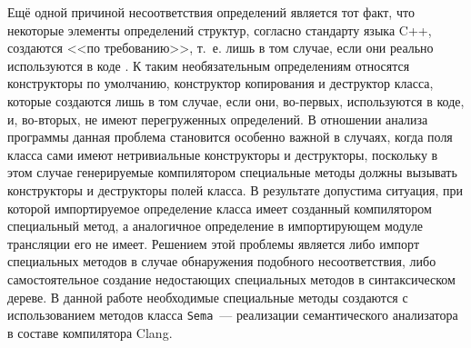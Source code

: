 Ещё одной причиной несоответствия определений является тот факт, что некоторые элементы определений структур, согласно стандарту языка C++, создаются <<по требованию>>, т.~е. лишь в том случае, если они реально используются в коде \cite{cpp-std}. К таким необязательным определениям относятся конструкторы по умолчанию, конструктор копирования и деструктор класса, которые создаются лишь в том случае, если они, во-первых, используются в коде, и, во-вторых, не имеют перегруженных определений. В отношении анализа программы данная проблема становится особенно важной в случаях, когда поля класса сами имеют нетривиальные конструкторы и деструкторы, поскольку в этом случае генерируемые компилятором специальные методы должны вызывать конструкторы и деструкторы полей класса. В результате допустима ситуация, при которой импортируемое определение класса имеет созданный компилятором специальный метод, а аналогичное определение в импортирующем модуле трансляции его не имеет. Решением этой проблемы является либо импорт специальных методов в случае обнаружения подобного несоответствия, либо самостоятельное создание недостающих специальных методов в синтаксическом дереве. В данной работе необходимые специальные методы создаются с использованием методов класса \texttt{Sema}~--- реализации семантического анализатора в составе компилятора Clang.
% 
% 
% 
% 

